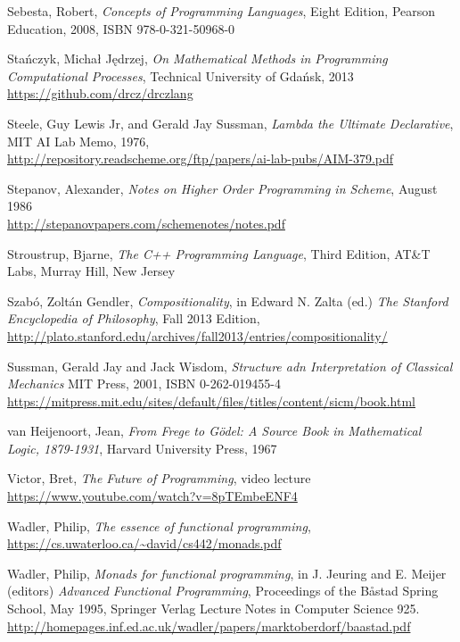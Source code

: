 \begin{thebibliography}{90}
  Sebesta, Robert,
  \emph{Concepts of Programming Languages},
  Eight Edition, Pearson Education, 2008,
  ISBN 978-0-321-50968-0

  Stańczyk, Michał Jędrzej,
  \emph{On Mathematical Methods in Programming Computational Processes},
  Technical University of Gdańsk, 2013 \\
  \url{https://github.com/drcz/drczlang}

  Steele, Guy Lewis Jr, and Gerald Jay Sussman,
  \emph{Lambda the Ultimate Declarative}, MIT AI Lab Memo, 1976, \\
  \url{http://repository.readscheme.org/ftp/papers/ai-lab-pubs/AIM-379.pdf}

  Stepanov, Alexander,
  \emph{Notes on Higher Order Programming in Scheme}, August 1986 \\
  \url{http://stepanovpapers.com/schemenotes/notes.pdf}
  
  Stroustrup, Bjarne,
  \emph{The C++ Programming Language},
  Third Edition, AT\&T Labs, Murray Hill, New Jersey

  Szabó, Zoltán Gendler,
  \emph{Compositionality}, in
  Edward N. Zalta (ed.)
  \emph{The Stanford Encyclopedia of Philosophy},
  Fall 2013 Edition, \\
  \url{http://plato.stanford.edu/archives/fall2013/entries/compositionality/}
  
  Sussman, Gerald Jay and Jack Wisdom,
  \emph{Structure adn Interpretation of Classical Mechanics}
  MIT Press, 2001, ISBN 0-262-019455-4 \\
  \url{https://mitpress.mit.edu/sites/default/files/titles/content/sicm/book.html}

  van Heijenoort, Jean, \emph{From Frege to Gödel: A Source Book
    in Mathematical Logic, 1879-1931}, Harvard University Press, 1967

  Victor, Bret, \emph{The Future of Programming}, video lecture \\
  \url{https://www.youtube.com/watch?v=8pTEmbeENF4}
  
  Wadler, Philip,
  \emph{The essence of functional programming}, \\
  \url{https://cs.uwaterloo.ca/~david/cs442/monads.pdf}
  
  Wadler, Philip,
  \emph{Monads for functional programming},
  in J. Jeuring and E. Meijer (editors) \emph{Advanced Functional Programming},
  Proceedings of the Båstad Spring School, May 1995, Springer Verlag
  Lecture Notes in Computer Science 925.\\
  \url{http://homepages.inf.ed.ac.uk/wadler/papers/marktoberdorf/baastad.pdf}
  

\end{thebibliography}
